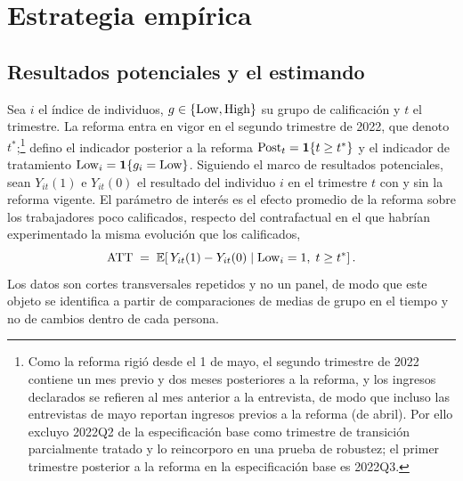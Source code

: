 \section{Estrategia empírica}\label{sec:strategy}

\subsection{Resultados potenciales y el estimando}

Sea $i$ el índice de individuos, $g\in\{\mathrm{Low},\mathrm{High}\}$ su grupo de calificación y $t$ el trimestre. La reforma entra en vigor en el segundo trimestre de 2022, que denoto $t^{\ast}$;\footnote{Como la reforma rigió desde el 1 de mayo, el segundo trimestre de 2022 contiene un mes previo y dos meses posteriores a la reforma, y los ingresos declarados se refieren al mes anterior a la entrevista, de modo que incluso las entrevistas de mayo reportan ingresos previos a la reforma (de abril). Por ello excluyo 2022Q2 de la especificación base como trimestre de transición parcialmente tratado y lo reincorporo en una prueba de robustez; el primer trimestre posterior a la reforma en la especificación base es 2022Q3.} defino el indicador posterior a la reforma $\mathrm{Post}_t=\mathbf{1}\{t\ge t^{\ast}\}$ y el indicador de tratamiento $\mathrm{Low}_i=\mathbf{1}\{g_i=\mathrm{Low}\}$. Siguiendo el marco de resultados potenciales, sean $Y_{it}(1)$ e $Y_{it}(0)$ el resultado del individuo $i$ en el trimestre $t$ con y sin la reforma vigente. El parámetro de interés es el efecto promedio de la reforma sobre los trabajadores poco calificados, respecto del contrafactual en el que habrían experimentado la misma evolución que los calificados,
\begin{equation}
\mathrm{ATT} \;=\; \mathbb{E}\!\left[\,Y_{it}(1)-Y_{it}(0)\;\middle|\;\mathrm{Low}_i=1,\;t\ge t^{\ast}\right].
\end{equation}
Los datos son cortes transversales repetidos y no un panel, de modo que este objeto se identifica a partir de comparaciones de medias de grupo en el tiempo y no de cambios dentro de cada persona.

